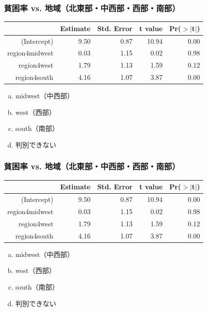 
\begin{frame}
\frametitle{貧困率 vs. 地域（北東部・中西部・西部・南部）}


{\small
\begin{center}
\begin{tabular}{rrrrr}
  \hline
 & Estimate & Std. Error & t value & Pr($>$$|$t$|$) \\
  \hline
(Intercept) & 9.50 & 0.87 & 10.94 & 0.00 \\
region4midwest & 0.03 & 1.15 & 0.02 & 0.98 \\
region4west & 1.79 & 1.13 & 1.59 & 0.12 \\
region4south & 4.16 & 1.07 & 3.87 & 0.00 \\
   \hline
\end{tabular}
\end{center}
}

\begin{enumerate}[(a)]
\item midwest（中西部）
\item west（西部）
\item south（南部）
\item 判別できない
\end{enumerate}

\end{frame}


\begin{frame}
\frametitle{貧困率 vs. 地域（北東部・中西部・西部・南部）}


{\small
\begin{center}
\begin{tabular}{rrrrr}
  \hline
 & Estimate & Std. Error & t value & Pr($>$$|$t$|$) \\
  \hline
(Intercept) & 9.50 & 0.87 & 10.94 & 0.00 \\
region4midwest & 0.03 & 1.15 & 0.02 & 0.98 \\
region4west & 1.79 & 1.13 & 1.59 & 0.12 \\
region4south & 4.16 & 1.07 & 3.87 & 0.00 \\
   \hline
\end{tabular}
\end{center}
}

\begin{enumerate}[(a)]
\item midwest（中西部）
\item west（西部）
\item south（南部）
\item 判別できない
\end{enumerate}

\end{frame}

